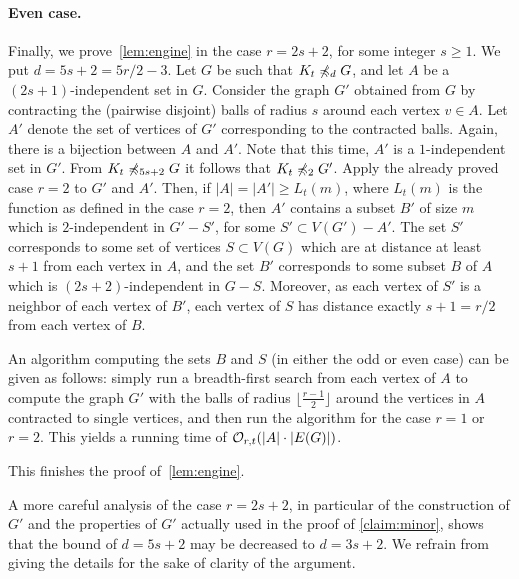 \paragraph{Even case.}
 Finally,
 we prove~\cref{lem:engine} in the case $r=2s+2$, for some integer $s\geq 1$. We put $d=5s+2=5r/2-3$. 
Let $G$  be such that 
 $K_t\not\preccurlyeq_{d} G$, and
let $A$ be a $(2s+1)$-independent set in $G$. Consider the graph $G'$ obtained from $G$
by contracting the (pairwise disjoint) balls of radius $s$ around each vertex $v\in A$.
 Let $A'$ denote the set of vertices of $G'$ corresponding to the contracted balls. Again, there is a bijection between $A$ and $A'$. Note that
this time, $A'$ is a $1$-independent set in $G'$.
From $K_t\not\preccurlyeq_{5s+2} G$ it follows that $K_t\not\preccurlyeq_2 G'$. Apply the already proved case $r=2$ to $G'$ and $A'$. 
Then, if $|A|=|A'|\ge L_t(m)$, where $L_t(m)$ is the function as defined in the case $r=2$, then
 $A'$ contains a subset $B'$ of size $m$
which is  $2$-independent in $G'-S'$, for some $S'\subset V(G')-A'$.
The set $S'$ corresponds to some set of vertices $S\subset V(G)$
which are at distance at least $s+1$ from each vertex in $A$,
and the set  $B'$ corresponds to some subset $B$ of $A$
which is $(2s+2)$-independent in $G-S$. Moreover, as each vertex of $S'$
is a neighbor of each vertex of $B'$,  each vertex of $S$
has distance exactly $s+1=r/2$ from each vertex of $B$.

\medskip
An algorithm computing the sets $B$ and $S$ (in either the odd or even case) can be given as follows:
simply run a breadth-first search from each vertex of $A$ to compute the graph $G'$ with the balls of radius  $\lfloor \frac{r-1}2 \rfloor$  around the vertices in $A$ contracted to single vertices, 
and then run the algorithm for the case $r=1$ or $r=2$.
This yields a running time of  $\mathcal{O}_{r,t}(|A|\cdot |E(G)|)$.
 \medskip
  
This finishes  the proof of~\cref{lem:engine}.

\begin{remark}
A more careful analysis of the case $r=2s+2$, in particular of the construction of $G'$ and the properties of $G'$ actually used in the proof of \cref{claim:minor},
shows that the bound of $d=5s+2$ may be decreased to $d=3s+2$. We refrain from giving the details for the sake of clarity of the argument.
\end{remark}

\begin{comment}
\begin{remark}
	It is not difficult to decrease the bound from $d=5s+2$ to $d= 3s+2$
	in the  case when $r=2s+2$. To do so, one would need to formulate~\cref{lem:apex}
	a bit more carefully, and replace the first possibility $K_t\minor_2 G$
	by the following condition, corresponding to the statement of~\cref{claim:minor}:
\begin{quote}
	There are vertices $a_1,b_1,\ldots,a_t,b_t\in A$ 
	such that for each $1\le i\le j\le t$, there is a vertex $z_{ij}\in V(G)-A$
	which is a neighbor of $a_i$ and $b_j$, but not of $b_s$, for $s\neq j$.	
\end{quote}
\end{remark}
\end{comment}


